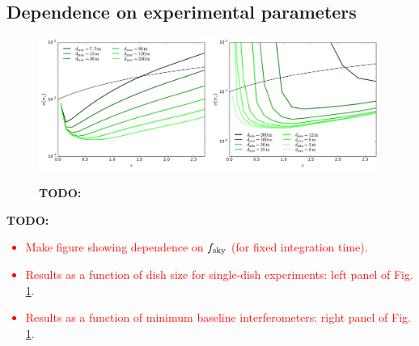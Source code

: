 \documentclass[prd,twocolumn]{revtex4}
\newcommand{\TODO}[1]{{\bf TODO:} \textcolor{red}{#1}}
\begin{document}
  \subsection{Dependence on experimental parameters} \label{ssec:results.params}
    \begin{figure}
      \centering
      \includegraphics[width=0.49\textwidth]{compare_dmax}
      \includegraphics[width=0.49\textwidth]{compare_dmin}
      \caption{\TODO{}}
      \label{fig:compare_baselines}
    \end{figure}
    \TODO{
      \begin{itemize}
        \item Make figure showing dependence on $f_{\rm sky}$ (for fixed integration time).
        \item Results as a function of dish size for single-dish experiments: left panel of Fig. \ref{fig:compare_baselines}.
        \item Results as a function of minimum baseline interferometers: right panel of Fig. \ref{fig:compare_baselines}.
      \end{itemize}
    }
\end{document}
